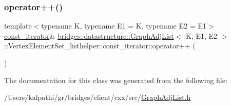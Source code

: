 \subsubsection{\texorpdfstring{operator++()}{operator++()}}
{\footnotesize\ttfamily template$<$typename K, typename E1 = K, typename E2 = E1$>$ \\
\mbox{\hyperlink{classbridges_1_1datastructure_1_1_graph_adj_list_1_1_vertex_element_set__listhelper_1_1const__iterator}{const\+\_\+iterator}}\& \mbox{\hyperlink{classbridges_1_1datastructure_1_1_graph_adj_list}{bridges\+::datastructure\+::\+Graph\+Adj\+List}}$<$ K, E1, E2 $>$\+::Vertex\+Element\+Set\+\_\+listhelper\+::const\+\_\+iterator\+::operator++ (\begin{DoxyParamCaption}{ }\end{DoxyParamCaption})\hspace{0.3cm}{\ttfamily [inline]}}



The documentation for this class was generated from the following file\+:\begin{DoxyCompactItemize}
\item 
/\+Users/kalpathi/gr/bridges/client/cxx/src/\mbox{\hyperlink{_graph_adj_list_8h}{Graph\+Adj\+List.\+h}}\end{DoxyCompactItemize}
